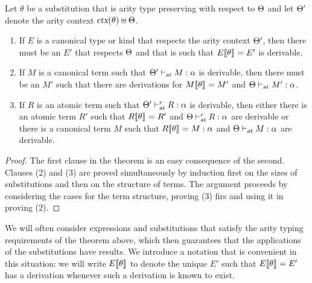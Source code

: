 \begin{theorem}\label{th:aritysubs}
Let $\theta$ be a substitution that is arity type preserving with
respect to $\Theta$ and let $\Theta'$ denote the arity context 
$\mbox{\sl ctx}(\theta) \uplus \Theta$. 
%
\begin{enumerate}
\item If $E$ is a canonical type or kind that respects the
  arity context $\Theta'$, then there must be an $E'$ that
  respects $\Theta$ and that is such that $E\llbracket {\theta} \rrbracket_{} = E'$
  is derivable. 

\item If $M$ is a canonical term such that
$\Theta' \vdash_{\mbox{\sl \scriptsize at}} M : \alpha$ is
derivable, then there must be an $M'$ such that there are derivations
for $M\llbracket {\theta} \rrbracket_{} = M'$ and $\Theta \vdash_{\mbox{\sl \scriptsize at}} M' : \alpha$.

\item If $R$ is an atomic term such that
  $\Theta' \vdash^r_{\mbox{\sl\scriptsize at}} R : \alpha$
  is derivable, then either there is an atomic term $R'$ such that
  $R\llbracket {\theta} \rrbracket_{} = R'$ and $\Theta \vdash^r_{\mbox{\sl\scriptsize at}} R : \alpha$ are
  derivable or there is a canonical term $M$ such that
  $R\llbracket {\theta} \rrbracket_{} = M : \alpha$ and
  $\Theta \vdash_{\mbox{\sl \scriptsize at}} M : \alpha$ are derivable. 
\end{enumerate}
\end{theorem}
\begin{proof}
The first clause in the theorem is an easy consequence of the
second. Clauses (2) and (3) are proved simultaneously by induction
first on the sizes of substitutions and then on the structure of
terms.
% 
The argument proceeds by considering the cases for the term structure,
proving (3) firs and using it in proving (2). 
\end{proof}

We will often consider expressions and substitutions that satisfy the
arity typing requirements of the theorem above, which then guarantees
that the applications of the substitutions have results.  
%
We introduce a notation that is convenient in this situation: we will
write $E\llbracket {\theta} \rrbracket$ to denote the unique $E'$ such that
$E\llbracket {\theta} \rrbracket_{} = E'$ has a derivation whenever such a derivation is
known to exist.



